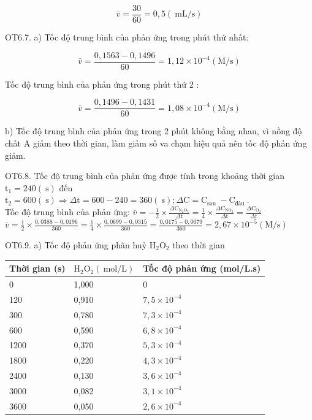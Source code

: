 \documentclass[10pt]{article}
\begin{document}
$$
\bar{v}=\frac{30}{60}=0,5(\mathrm{~mL} / \mathrm{s})
$$

OT6.7. a) Tốc độ trung bình của phản ứng trong phút thứ nhất:

$$
\bar{v}=\frac{0,1563-0,1496}{60}=1,12 \times 10^{-4}(\mathrm{M} / \mathrm{s})
$$

Tốc độ trung bình của phản ứng trong phút thứ 2 :

$$
\bar{v}=\frac{0,1496-0,1431}{60}=1,08 \times 10^{-4}(\mathrm{M} / \mathrm{s})
$$

b) Tốc độ trung bình của phản ứng trong 2 phút không bằng nhau, vì nồng độ chất A giảm theo thời gian, làm giảm số va chạm hiệu quả nên tốc độ phản ứng giảm.

OT6.8. Tốc độ trung bình của phản ứng được tính trong khoảng thời gian $\mathrm{t}_{1}=240(\mathrm{~s})$ đến $\mathrm{t}_{2}=600(\mathrm{~s}) \Rightarrow \Delta \mathrm{t}=600-240=360(\mathrm{~s}) ; \Delta \mathrm{C}=\mathrm{C}_{\text {sau }}-\mathrm{C}_{\text {đàu }}$.\\
Tốc độ trung bình của phản ứng: $\bar{v}=-\frac{1}{2} \times \frac{\Delta \mathrm{C}_{\mathrm{N}_{2} \mathrm{O}_{5}}}{\Delta \mathrm{t}}=\frac{1}{4} \times \frac{\Delta \mathrm{C}_{\mathrm{NO}_{2}}}{\Delta \mathrm{t}}=\frac{\Delta \mathrm{C}_{\mathrm{O}_{2}}}{\Delta \mathrm{t}}$\\
$\bar{v}=\frac{1}{2} \times \frac{0,0388-0,0196}{360}=\frac{1}{4} \times \frac{0,0699-0,0315}{360}=\frac{0,0175-0,0079}{360}=2,67 \times 10^{-5}(\mathrm{M} / \mathrm{s})$

OT6.9. a) Tốc độ phản ứng phân huỷ $\mathrm{H}_{2} \mathrm{O}_{2}$ theo thời gian

\begin{center}
\begin{tabular}{|l|l|l|}
\hline
Thời gian (s) & $\mathrm{H}_{2} \mathrm{O}_{2}(\mathrm{~mol} / \mathrm{L})$ & Tốc độ phản ứng (mol/L.s) \\
\hline
0 & 1,000 & 0 \\
\hline
120 & 0,910 & $7,5 \times 10^{-4}$ \\
\hline
300 & 0,780 & $7,3 \times 10^{-4}$ \\
\hline
600 & 0,590 & $6,8 \times 10^{-4}$ \\
\hline
1200 & 0,370 & $5,3 \times 10^{-4}$ \\
\hline
1800 & 0,220 & $4,3 \times 10^{-4}$ \\
\hline
2400 & 0,130 & $3,6 \times 10^{-4}$ \\
\hline
3000 & 0,082 & $3,1 \times 10^{-4}$ \\
\hline
3600 & 0,050 & $2,6 \times 10^{-4}$ \\
\hline
\end{tabular}
\end{center}
\end{document}
